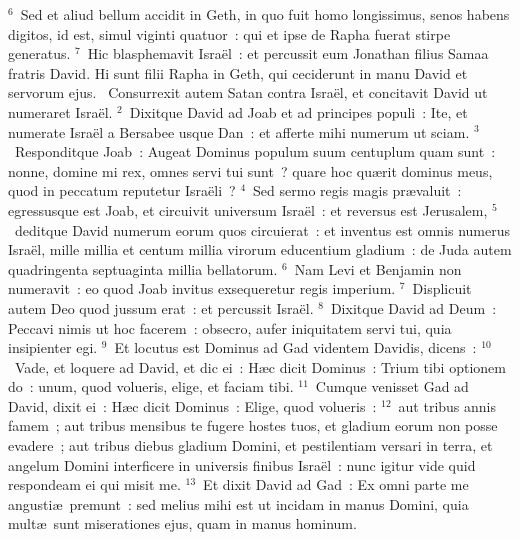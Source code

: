 ${}^{6}$~Sed et aliud bellum accidit in Geth, in quo fuit homo longissimus, senos habens digitos, id est, simul viginti quatuor~: qui et ipse de Rapha fuerat stirpe generatus.
${}^{7}$~Hic blasphemavit Isra\"el~: et percussit eum Jonathan filius Samaa fratris David. Hi sunt filii Rapha in Geth, qui ceciderunt in manu David et servorum ejus.
~\lettrine[lines=10,image=true,loversize=0.05,lraise=-0.03]{C}{}onsurrexit autem Satan contra Isra\"el, et concitavit David ut numeraret Isra\"el.
${}^{2}$~Dixitque David ad Joab et ad principes populi~: Ite, et numerate Isra\"el a Bersabee usque Dan~: et afferte mihi numerum ut sciam.
${}^{3}$~Responditque Joab~: Augeat Dominus populum suum centuplum quam sunt~: nonne, domine mi rex, omnes servi tui sunt~? quare hoc qu\ae rit dominus meus, quod in peccatum reputetur Isra\"eli~?
${}^{4}$~Sed sermo regis magis pr\ae valuit~: egressusque est Joab, et circuivit universum Isra\"el~: et reversus est Jerusalem,
${}^{5}$~deditque David numerum eorum quos circuierat~: et inventus est omnis numerus Isra\"el, mille millia et centum millia virorum educentium gladium~: de Juda autem quadringenta septuaginta millia bellatorum.
${}^{6}$~Nam Levi et Benjamin non numeravit~: eo quod Joab invitus exsequeretur regis imperium.
${}^{7}$~Displicuit autem Deo quod jussum erat~: et percussit Isra\"el.
${}^{8}$~Dixitque David ad Deum~: Peccavi nimis ut hoc facerem~: obsecro, aufer iniquitatem servi tui, quia insipienter egi.
${}^{9}$~Et locutus est Dominus ad Gad videntem Davidis, dicens~:
${}^{10}$~Vade, et loquere ad David, et dic ei~: H\ae c dicit Dominus~: Trium tibi optionem do~: unum, quod volueris, elige, et faciam tibi.
${}^{11}$~Cumque venisset Gad ad David, dixit ei~: H\ae c dicit Dominus~: Elige, quod volueris~:
${}^{12}$~aut tribus annis famem~; aut tribus mensibus te fugere hostes tuos, et gladium eorum non posse evadere~; aut tribus diebus gladium Domini, et pestilentiam versari in terra, et angelum Domini interficere in universis finibus Isra\"el~: nunc igitur vide quid respondeam ei qui misit me.
${}^{13}$~Et dixit David ad Gad~: Ex omni parte me angusti\ae\ premunt~: sed melius mihi est ut incidam in manus Domini, quia mult\ae\ sunt miserationes ejus, quam in manus hominum.


